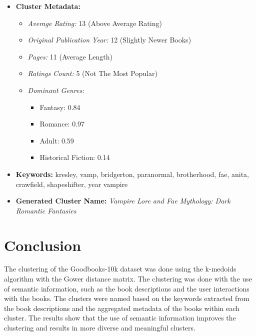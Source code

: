 \documentclass[english]{mvi-report}
\begin{document}
\begin{itemize}
    \item \textbf{Cluster Metadata:}
        \begin{itemize}
            \item \textit{Average Rating:} 13 (Above Average Rating)
            \item \textit{Original Publication Year:} 12 (Slightly Newer Books)
            \item \textit{Pages:} 11 (Average Length)
            \item \textit{Ratings Count:} 5 (Not The Most Popular)
            \item \textit{Dominant Genres:}
                \begin{itemize}
                    \item Fantasy: 0.84
                    \item Romance: 0.97
                    \item Adult: 0.59
                    \item Historical Fiction: 0.14
                \end{itemize}
        \end{itemize}
    \item \textbf{Keywords:} kresley, vamp, bridgerton, paranormal, brotherhood, fae, anita, crawfield, shapeshifter, year vampire
    \item \textbf{Generated Cluster Name:}
\textit{Vampire Lore and Fae Mythology: Dark Romantic Fantasies}
\end{itemize}

\section{Conclusion}
The clustering of the Goodbooks-10k dataset was done using the k-medoids algorithm with the Gower distance matrix. The clustering was done with the use of semantic information, such as the book descriptions and the user interactions with the books. The clusters were named based on the keywords extracted from the book descriptions and the aggregated metadata of the books within each cluster. The results show that the use of semantic information improves the clustering and results in more diverse and meaningful clusters.


\end{document}
